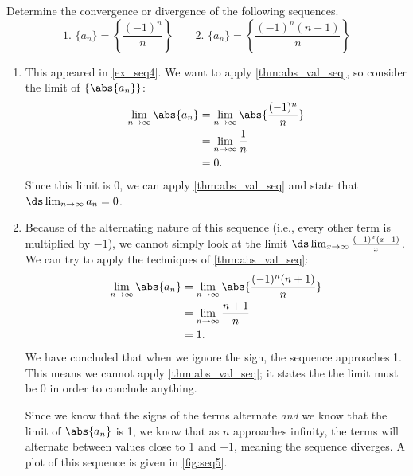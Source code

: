 \begin{example}\label{ex_seq5}
Determine the convergence or divergence of the following sequences.
\[
 \text{1. }\{a_n\} = \left\{\frac{(-1)^n}{n}\right\}\qquad
 \text{2. }\{a_n\} = \left\{\frac{(-1)^n(n+1)}{n}\right\}
\]
\solution
\begin{enumerate}
\item		This appeared in \autoref{ex_seq4}. We want to apply \autoref{thm:abs_val_seq}, so consider the limit of $\{\abs{a_n}\}$:
\begin{align*}
\lim_{n\to\infty}\abs{a_n}&= \lim_{n\to\infty} \abs{\frac{(-1)^n}{n}} \\
					&= \lim_{n\to\infty} \frac1n \\
					&= 0.
\end{align*}
Since this limit is 0, we can apply \autoref{thm:abs_val_seq} and state that $\ds\lim_{n\to\infty} a_n=0$.

\item Because of the alternating nature of this sequence (i.e., every other term is multiplied by $-1$), we cannot simply look at the limit $\ds \lim_{x\to\infty} \frac{(-1)^x(x+1)}{x}$. We can try to apply the techniques of \autoref{thm:abs_val_seq}:
\begin{align*}
	\lim_{n\to\infty}\abs{a_n}
	&= \lim_{n\to\infty} \abs{\frac{(-1)^n(n+1)}{n}} \\
	&= \lim_{n\to\infty} \frac{n+1}{n}\\
	&= 1.
\end{align*}
%
%
%
We have concluded that when we ignore the sign, the sequence approaches 1. This means we cannot apply \autoref{thm:abs_val_seq}; it states the the limit must be 0 in order to conclude anything.

Since we know that the signs of the terms alternate \emph{and} we know that the limit of $\abs{a_n}$ is 1, we know that as $n$ approaches infinity, the terms will alternate between values close to 1 and $-1$, meaning the sequence diverges. A plot of this sequence is given in \autoref{fig:seq5}.
\end{enumerate}
\end{example}

